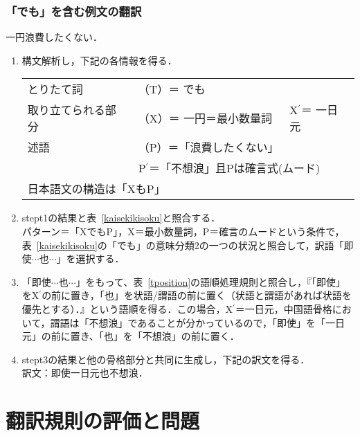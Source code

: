 \subsubsection{「でも」を含む例文の翻訳}
\begin{enumerates}
 \setcounter{enumi}{18}
 \item 一円浪費したくない．
       \begin{enumerate}
	\item 構文解析し，下記の各情報を得る． \\
	      \begin{tabular}{lll}
	       とりたて詞 & （T）＝ でも \\
	       取り立てられる部分 & （X）＝ 一円＝最小数量詞 & X$^{\prime}$＝ 一日元 \\
	       述語 & （P）＝「浪費したくない」 \\
	        & \multicolumn{2}{l}{P$^{\prime}$＝「不想浪\kanji{n}」且Pは確言式(ムード)} \\
	       \multicolumn{3}{l}{日本語文の構造は「XもP」} \\
	      \end{tabular}
	\item stept1の結果と表~\ref{kaisekikisoku}と照合する． \\
	      パターン＝「XでもP」，X＝最小数量詞，P＝確言のムードという条件で，表~\ref{kaisekikisoku}の「でも」の意味分類2の一つの状況と照合して，訳語「即使$\cdots$也$\cdots$」を選択する．
	
	\item 「即使$\cdots$也$\cdots$」をもって、表~\ref{tposition}の語順処理規則と照合し，『「即使」をX$^{\prime}$の前に置き，「也」を状語/謂語の前に置く（状語と謂語があれば状語を優先とする）．』という語順を得る．この場合，X$^{\prime}$＝一日元，中国語骨格において，謂語は「不想浪」であることが分かっているので，「即使」を「一日元」の前に置き、「也」を「不想浪」の前に置く．
	\item stept3の結果と他の骨格部分と共同に生成し，下記の訳文を得る．\\
	      訳文：即使一日元也不想浪．
       \end{enumerate}
\end{enumerates}


\section{翻訳規則の評価と問題}
